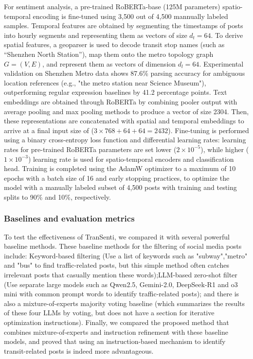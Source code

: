 \documentclass[a4paper,fleqn,12pt]{cas-sc}
\begin{document}
For sentiment analysis, a pre-trained RoBERTa-base (125M parameters) spatio-temporal encoding is fine-tuned using 3,500 out of 4,500 mannually labeled samples. Temporal features are obtained by segmenting the timestamps of posts into hourly segments and representing them as vectors of size \(d_t=64\). To derive spatial features, a geoparser is used to decode transit stop names (such as “Shenzhen North Station”), map them onto the metro topology graph \(G=(V,E)\), and represent them as vectors of dimension \(d_l=64\). Experimental validation on Shenzhen Metro data shows 87.6\% parsing accuracy for ambiguous location references (e.g., "the metro station near Science Museum"), outperforming regular expression baselines by 41.2 percentage points. Text embeddings are obtained through RoBERTa by combining pooler output with average pooling and max pooling methods to produce a vector of size 2304. Then, these representations are concatenated with spatial and temporal embeddings to arrive at a final input size of (\(3\times768+64+64=2432\)). Fine-tuning is performed using a binary cross-entropy loss function and differential learning rates: learning rates for pre-trained RoBERTa parameters are set lower (\(2\times10^{-5}\)), while higher (\(1\times10^{-3}\)) learning rate is used for spatio-temporal encoders and classification head. Training is completed using the AdamW optimizer to a maximum of 10 epochs with a batch size of 16 and early stopping practices, to optimize the model with a manually labeled subset of 4,500 posts with training and testing splits to 90\% and 10\%, respectively. 

\subsubsection{Baselines and evaluation metrics} 
To test the effectiveness of TranSenti, we compared it with several powerful baseline methods. These baseline methods for the filtering of social media posts include: Keyword-based filtering (Use a list of keywords such as "subway","metro" and "bus" to find traffic-related posts, but this simple method often catches irrelevant posts that casually mention these words);LLM-based zero-shot filter (Use separate large models such as Qwen2.5, Gemini-2.0, DeepSeek-R1 and o3 mini with common prompt words to identify traffic-related posts); and there is also a mixture-of-experts majority voting baseline (which summarizes the results of these four LLMs by voting, but does not have a section for iterative optimization instructions). Finally, we compared the proposed method that combines mixture-of-experts and instruction refinement with these baseline models, and proved that using an instruction-based mechanism to identify transit-related posts is indeed more advantageous.
\end{document}
